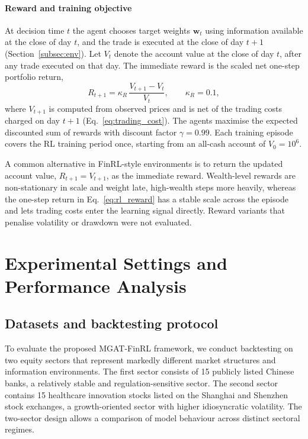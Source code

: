 \documentclass[pdflatex,sn-mathphys-num]{sn-jnl}%
\theoremstyle{thmstyleone}%
\theoremstyle{thmstyletwo}%
\theoremstyle{thmstylethree}%
\begin{document}
\paragraph{Reward and training objective}
{\color{blue}
At decision time $t$ the agent chooses target weights $\mathbf{w}_t$ using information available at the close of day $t$, and the trade is executed at the close of day $t+1$ (Section~\ref{subsec:env}). Let $V_t$ denote the account value at the close of day $t$, after any trade executed on that day. The immediate reward is the scaled net one-step portfolio return,
\begin{equation}
R_{t+1}=\kappa_R\,\frac{V_{t+1}-V_t}{V_t},\qquad \kappa_R=0.1,
\label{eq:rl_reward}
\end{equation}
where $V_{t+1}$ is computed from observed prices and is net of the trading costs charged on day $t+1$ (Eq.~\eqref{eq:trading_cost}). The agents maximise the expected discounted sum of rewards with discount factor $\gamma=0.99$. Each training episode covers the RL training period once, starting from an all-cash account of $V_0=10^6$.

A common alternative in FinRL-style environments is to return the updated account value, $R_{t+1}=V_{t+1}$, as the immediate reward. Wealth-level rewards are non-stationary in scale and weight late, high-wealth steps more heavily, whereas the one-step return in Eq.~\eqref{eq:rl_reward} has a stable scale across the episode and lets trading costs enter the learning signal directly. Reward variants that penalise volatility or drawdown were not evaluated.
\par}

\section{Experimental Settings and Performance Analysis}\label{sec5}

\subsection{Datasets and backtesting protocol}
To evaluate the proposed MGAT-FinRL framework, we conduct backtesting on two equity sectors that represent markedly different market structures and information environments. The first sector consists of 15 publicly listed Chinese banks, a relatively stable and regulation-sensitive sector. The second sector contains 15 healthcare innovation stocks listed on the Shanghai and Shenzhen stock exchanges, a growth-oriented sector with higher idiosyncratic volatility. The two-sector design allows a comparison of model behaviour across distinct sectoral regimes.
\end{document}
